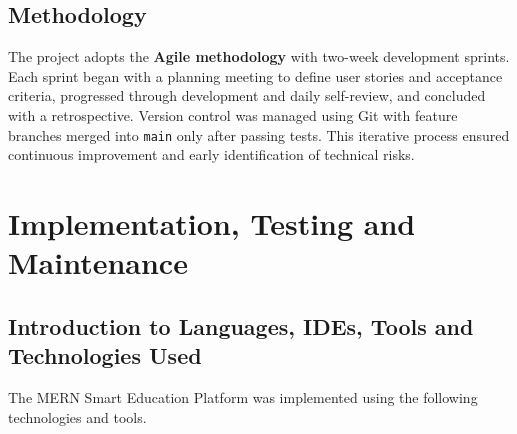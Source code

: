 \documentclass[12pt, a4paper, oneside]{report}
\begin{document}
\section{Methodology}

The project adopts the \textbf{Agile methodology} with two-week development sprints. Each sprint began with a planning meeting to define user stories and acceptance criteria, progressed through development and daily self-review, and concluded with a retrospective. Version control was managed using Git with feature branches merged into \texttt{main} only after passing tests. This iterative process ensured continuous improvement and early identification of technical risks.

\chapter{Implementation, Testing and Maintenance}

\section{Introduction to Languages, IDEs, Tools and Technologies Used}

The MERN Smart Education Platform was implemented using the following technologies and tools.
\end{document}
